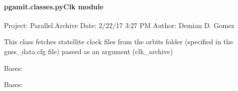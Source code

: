 \documentclass[letterpaper,10pt,english]{sphinxmanual}
\begin{document}
\paragraph{pgamit.classes.pyClk module}
\label{\detokenize{pgamit.classes:module-pgamit.classes.pyClk}}\label{\detokenize{pgamit.classes:pgamit-classes-pyclk-module}}
\sphinxAtStartPar
Project: Parallel.Archive
Date: 2/22/17 3:27 PM
Author: Demian D. Gomez

\sphinxAtStartPar
This class fetches statellite clock files from the orbits folder (specified in
the gnss\_data.cfg file) passed as an argument (clk\_archive)

\begin{fulllineitems}
\label{\detokenize{pgamit.classes:pgamit.classes.pyClk.GetClkFile}}
\pysigstartsignatures
\pysiglinewithargsret
{}
{\sphinxparamcomma {}\sphinxparamcomma {}\sphinxparamcomma {}\sphinxparamcomma {}}
{}
\pysigstopsignatures
\sphinxAtStartPar
Bases: {\hyperref[\detokenize{pgamit.classes:pgamit.classes.pyProducts.OrbitalProduct}]{}}

\begin{fulllineitems}
\label{\detokenize{pgamit.classes:pgamit.classes.pyClk.GetClkFile.cleanup}}
\pysigstartsignatures
\pysiglinewithargsret
{}
{}
{}
\pysigstopsignatures
\end{fulllineitems}


\end{fulllineitems}


\begin{fulllineitems}
\label{\detokenize{pgamit.classes:pgamit.classes.pyClk.pyClkException}}
\pysigstartsignatures
\pysiglinewithargsret
{}
{}
{}
\pysigstopsignatures
\sphinxAtStartPar
Bases: {\hyperref[\detokenize{pgamit.classes:pgamit.classes.pyProducts.pyProductsException}]{}}

\end{fulllineitems}
\end{document}
